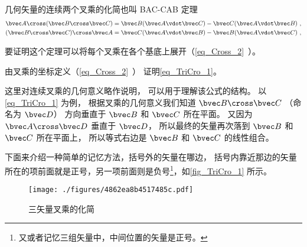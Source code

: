

几何矢量的连续两个叉乘的化简也叫 BAC-CAB 定理
\begin{gather}
\bvec A \cross (\bvec B \cross \bvec C) = \bvec B (\bvec A \vdot \bvec C) - \bvec C (\bvec A \vdot \bvec B)\label{eq_TriCro_1}~,\\
(\bvec B \cross \bvec C) \cross \bvec A = \bvec C (\bvec A \vdot \bvec B) - \bvec B (\bvec A \vdot \bvec C)~,
\end{gather}

要证明这个定理可以将每个叉乘在各个基底上展开（\autoref{eq_Cross_2}~）。

\begin{exercise}{}
由叉乘的坐标定义（\autoref{eq_Cross_2}~） 证明\autoref{eq_TriCro_1}。
\end{exercise} 

这里对连续叉乘的几何意义略作说明， 可以用于理解该公式的结构。 以\autoref{eq_TriCro_1} 为例， 根据叉乘的几何意义我们知道 $\bvec B \cross \bvec C$ （命名为 $\bvec D$） 方向垂直于 $\bvec B$ 和 $\bvec C$ 所在平面。 又因为 $\bvec A \cross \bvec D$ 垂直于 $\bvec D$， 所以最终的矢量再次落到 $\bvec B$ 和 $\bvec C$ 所在平面上， 所以等式右边是 $\bvec B$ 和 $\bvec C$ 的线性组合。

下面来介绍一种简单的记忆方法，括号外的矢量在哪边， 括号内靠近那边的矢量所在的项前面就是正号，另一项前面则是负号\footnote{又或者记忆三组矢量中，中间位置的矢量是正号。}，如\autoref{fig_TriCro_1} 所示。

\begin{figure}[ht]
\centering
\texttt{[image: ./figures/4862ea8b4517485c.pdf]}
\caption{三矢量叉乘的化简}\label{fig_TriCro_1}
\end{figure}

